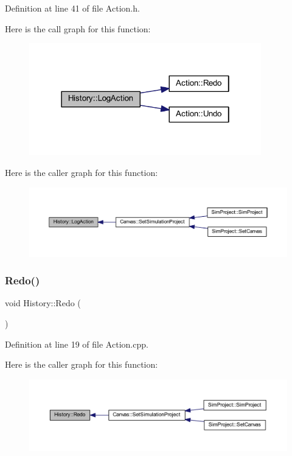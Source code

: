 Definition at line 41 of file Action.\+h.

Here is the call graph for this function\+:\nopagebreak
\begin{figure}[H]
\begin{center}
\leavevmode
\includegraphics[width=286pt]{class_history_ae2286b5c19bc1a5947caf33bdc5a39b0_cgraph}
\end{center}
\end{figure}
Here is the caller graph for this function\+:
\nopagebreak
\begin{figure}[H]
\begin{center}
\leavevmode
\includegraphics[width=350pt]{class_history_ae2286b5c19bc1a5947caf33bdc5a39b0_icgraph}
\end{center}
\end{figure}
\mbox{\label{class_history_abc639588fdca61df2902377e08a64dd6}} 
\subsubsection{\texorpdfstring{Redo()}{Redo()}}
{\footnotesize\ttfamily void History\+::\+Redo (\begin{DoxyParamCaption}{ }\end{DoxyParamCaption})}



Definition at line 19 of file Action.\+cpp.

Here is the caller graph for this function\+:
\nopagebreak
\begin{figure}[H]
\begin{center}
\leavevmode
\includegraphics[width=350pt]{class_history_abc639588fdca61df2902377e08a64dd6_icgraph}
\end{center}
\end{figure}
\mbox{\label{class_history_a4cf63a4e996f75e5c3b99b42fe56c6d3}} 
